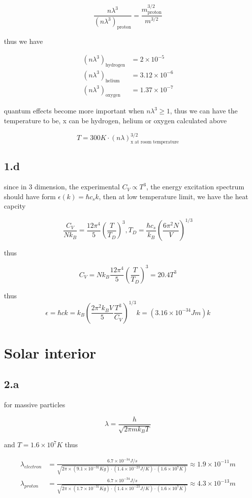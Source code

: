 \documentclass{article}
\begin{document}
$$
\frac{n\lambda^3}{(n\lambda^3)_{\text{proton}}} = \frac{m_{\text{proton}}^{3/2}}{m^{3/2}}
$$

thus we have

$$
\begin{aligned}
    (n\lambda^3)_{\text{hydrogen}} &= 2\times 10^{-5}\\
    (n\lambda^3)_{\text{helium}} &= 3.12\times 10^{-6}\\
    (n\lambda^3)_{\text{oxygen}} &= 1.37\times 10^{-7}
\end{aligned}
$$

quantum effects become more important when $n\lambda^3 \geq 1$, thus we can have the temperature to be,
x can be hydrogen, helium or oxygen calculated above

$$
T = 300K \cdot (n\lambda)^{3/2}_{\text{x at room temperature}}
$$

\subsection*{1.d}
since in 3 dimension, the experimental $C_V \propto T^3$, the energy excitation spectrum should have form
$\epsilon(k) = \hbar c_s k$, then at low temperature limit, we have the heat capcity

$$
\frac{C_V}{Nk_B} = \frac{12\pi^4}{5} (\frac{T}{T_D})^3, T_D = \frac{\hbar c_s}{k_B} (\frac{6\pi^2 N}{V})^{1/3}
$$

thus

$$
C_V = Nk_B \frac{12\pi^4}{5} (\frac{T}{T_D})^3 = 20.4 T^3
$$

thus
$$
\epsilon = \hbar c k = k_B (\frac{2\pi^2 k_B V}{5} \frac{T^3}{C_V})^{1/3} k = (3.16 \times 10^{-34} Jm)k
$$

\section*{Solar interior}
\subsection*{2.a}

for massive particles

$$
\lambda = \frac{h}{\sqrt{2\pi m k_B T}}
$$

and $T = 1.6\times 10^7 K$ thus

$$
\begin{aligned}
    \lambda_{electron} &= \frac{6.7\times 10^{-34} J/s}{\sqrt{2\pi \times (9.1\times 10^{-31} Kg)\cdot (1.4\times 10^{-23}J/K)\cdot (1.6\times 10^7 K)}} \approx 1.9\times 10^{-11}m\\
    \lambda_{proton} &= \frac{6.7\times 10^{-34} J/s}{\sqrt{2\pi \times (1.7\times 10^{-31} Kg)\cdot (1.4\times 10^{-23}J/K)\cdot (1.6\times 10^7 K)}} \approx 4.3\times 10^{-13}m\\
\end{aligned}
$$
\end{document}
